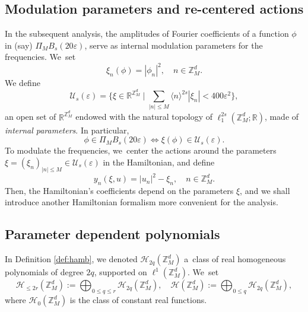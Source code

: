 \documentclass[10pt,a4paper]{amsart}
\let\ts\textstyle
\theoremstyle{plain}
\theoremstyle{definition}
\newcommand{\Z}{\mathbb{Z}}
\newcommand{\R}{\mathbb{R}}
\newcommand{\1}{\mathbf{1}}
\let\epsilon\varepsilon
\begin{document}
\subsection{Modulation parameters and re-centered actions} In the subsequent analysis, the amplitudes of Fourier coefficients of a function $\phi$ in (say) $\Pi_{M}B_s(20\epsilon)$, serve as internal modulation parameters for the frequencies. We~set\vspace*{-3pt}
\[
\xi_n(\phi) = |\phi_n|^2,\quad n\in\Z_{M}^{d}.
\]
We define\vspace*{-3pt}
\begin{equation}
\label{eq:U-eps}\ts
\mathcal{U}_{s}(\epsilon) = \bigl\{ \xi \in \R^{\Z_{M}^{d}}\mid \sum_{|n|\leq M}\langle n\rangle^{2s}|\xi_{n}| < 400\epsilon^{2}
\bigr\},
\end{equation}
an open set of $\R^{\Z_{M}^{d}}$ endowed with the natural topology of $\ell_{1}^{2s}(\Z_{M}^{d};\R)$, made of \emph{internal parameters}. In particular,\vspace*{-3pt}
\[
\phi \in \Pi_{M}B_{s}(20\epsilon)\iff \xi(\phi) \in \mathcal{U}_{s}(\epsilon).
\]
To modulate the frequencies, we~center the actions around the parameters $\xi=(\xi_{n})_{|n|\leq M}\in\mathcal{U}_{s}(\epsilon)$ in the Hamiltonian, and define\vspace*{-3pt}
\[
y_{n}(\xi,u) = |u_{n}|^{2} - \xi_{n},\quad n\in\Z_{M}^{d}.
\]
Then, the Hamiltonian's coefficients depend on the parameters $\xi$, and we shall introduce another Hamiltonian formalism more convenient for the analysis.
\subsection{Parameter dependent polynomials}
\label{sub:par}

In Definition \ref{def:hamb}, we denoted $\mathcal{H}_{2q}(\Z_{M}^{d})$ a~class of real homogeneous polynomials of degree $2q$, supported on $\ell^{1}(\Z_{M}^{d})$. We~set\vspace*{-3pt}
\[
\mathcal{H}_{\leq 2r}(\Z_{M}^{d})
:= \bigoplus_{0\leq q\leq r }
\mathcal{H}_{2q}(\Z_{M}^{d}),
\quad \mathcal{H}(\Z_{M}^{d})
:= \bigoplus_{0\leq q}
\mathcal{H}_{2q}(\Z_{M}^{d}),
\]
where $\mathcal{H}_{0}(\Z_{M}^{d})$ is the class of constant real functions.
\end{document}

